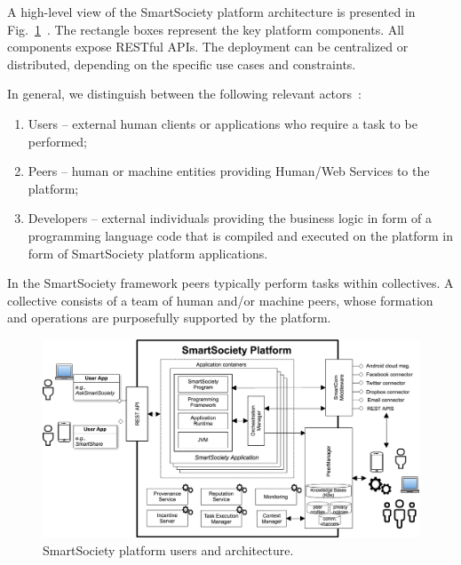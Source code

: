A high-level view of the SmartSociety platform architecture is presented in Fig.~\ref{fig:architecture}~\cite{scekic_soca2015}. 
The rectangle boxes represent the key platform components. All components expose RESTful APIs. The deployment can be centralized or distributed, depending on the specific use cases and constraints. 

In general, we distinguish between the following relevant actors~\cite{D7.2}:
\begin{enumerate}
\item Users – external human clients or applications who require a task to be performed;
\item Peers – human or machine entities providing Human/Web Services to the platform;
\item Developers – external individuals providing the business logic in form of a programming language code that is compiled and executed on the platform in form of SmartSociety platform applications.
\end{enumerate}
In the SmartSociety framework peers typically perform tasks within collectives. A collective consists of a team of human and/or machine peers, whose formation and operations are purposefully supported by the platform.


\begin{figure}[!ht]
 \centering
 \includegraphics[width=\linewidth]{figs/architecture_v3}%
 \caption{SmartSociety platform users and architecture.}
 \label{fig:architecture}
\end{figure}

